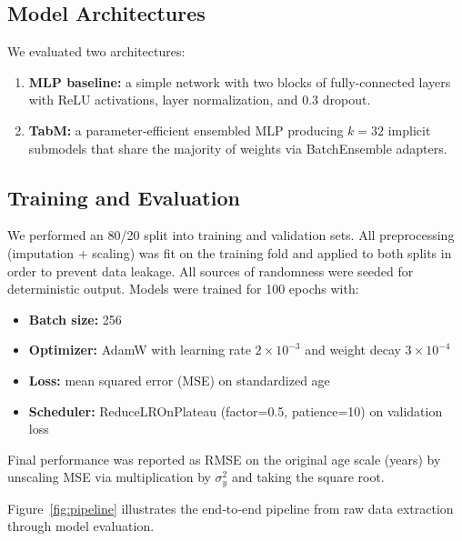 \documentclass[manuscript,screen,review]{acmart}
\begin{document}
\subsection{Model Architectures}
We evaluated two architectures:
\begin{enumerate}
  \item \textbf{MLP baseline:} a simple network with two blocks of fully-connected layers with ReLU activations, layer normalization, and $0.3$ dropout.
  \item \textbf{TabM:} a parameter‐efficient ensembled MLP \cite{gorishniy2025tabm} producing \(k=32\) implicit submodels that share the majority of weights via BatchEnsemble adapters.
\end{enumerate}

\subsection{Training and Evaluation}
We performed an 80/20 split into training and validation sets. All preprocessing (imputation + scaling) was fit on the training fold and applied to both splits in order to prevent data leakage. All sources of randomness were seeded for deterministic output. Models were trained for 100 epochs with:
\begin{itemize}
  \item \textbf{Batch size:} 256
  \item \textbf{Optimizer:} AdamW with learning rate $2\times10^{-3}$ and weight decay $3\times10^{-4}$
  \item \textbf{Loss:} mean squared error (MSE) on standardized age
  \item \textbf{Scheduler:} ReduceLROnPlateau (factor=0.5, patience=10) on validation loss
\end{itemize}
Final performance was reported as RMSE on the original age scale (years) by unscaling MSE via multiplication by $\sigma_y^2$ and taking the square root.

Figure~\ref{fig:pipeline} illustrates the end‐to‐end pipeline from raw data extraction through model evaluation.
\end{document}
